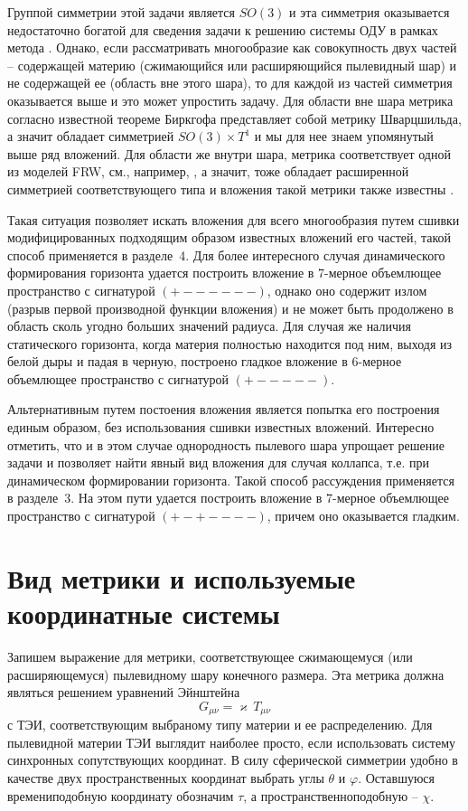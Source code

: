 \documentclass[12pt]{article}
\begin{document}
Группой симметрии этой задачи является $SO(3)$ и эта симметрия оказывается недостаточно богатой для сведения задачи
к решению системы ОДУ в рамках метода \cite{statja27}. Однако, если рассматривать многообразие как совокупность двух частей --
содержащей материю (сжимающийся или расширяющийся пылевидный шар) и не содержащей ее (область вне этого шара), то для каждой
из частей симметрия оказывается выше и это может упростить задачу. Для области вне шара метрика согласно известной теореме Биркгофа
представляет собой метрику Шварцшильда, а значит обладает симметрией $SO(3)\times T^1$ и мы для нее знаем
упомянутый выше ряд вложений. Для области же внутри шара, метрика соответствует одной из моделей FRW, см., например, \cite{landavshic2},
а значит, тоже обладает расширенной симметрией соответствующего типа и вложения такой метрики также известны \cite{robertson1933}.

Такая ситуация позволяет искать вложения для всего многообразия путем сшивки модифицированных подходящим образом
известных вложений его частей, такой способ применяется в разделе~4. Для более интересного случая динамического
формирования горизонта удается построить вложение в 7-мерное объемлющее пространство с сигнатурой $(+------)$,
однако оно содержит излом (разрыв первой производной функции вложения) и не может быть продолжено
в область сколь угодно больших значений радиуса. Для случая же наличия статического горизонта, когда материя
полностью находится под ним, выходя из белой дыры и падая в черную, построено гладкое вложение
в 6-мерное объемлющее пространство с сигнатурой $(+-----)$.

Альтернативным путем постоения вложения является попытка его построения
единым образом, без использования сшивки известных вложений. Интересно отметить, что и в этом случае
однородность пылевого шара упрощает решение задачи и позволяет найти явный вид вложения для случая коллапса,
т.е. при динамическом формировании горизонта. Такой способ рассуждения применяется в разделе~3.
На этом пути удается построить вложение в 7-мерное объемлющее пространство с сигнатурой $(+-+----)$,
причем оно оказывается гладким.




\section{Вид метрики и используемые координатные системы}
Запишем выражение для метрики, соответствующее сжимающемуся (или расширяющемуся) пылевидному шару конечного размера.
Эта метрика должна являться решением уравнений Эйнштейна
\begin{equation}
\label{G=T}
	G_{\mu \nu} = \varkappa\, T_{\mu \nu}
\end{equation}
с ТЭИ, соответствующим выбраному типу материи и ее распределению.
Для пылевидной материи ТЭИ выглядит наиболее просто, если использовать систему синхронных сопутствующих координат.
В силу сферической симметрии удобно в качестве двух пространственных координат выбрать углы $\theta$ и $\varphi$.
Оставшуюся времениподобную координату обозначим $\tau$, а пространственноподобную -- $\chi$.
\end{document}
